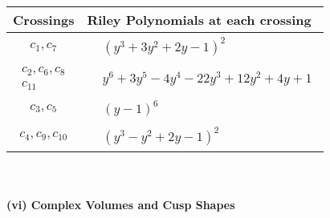 \documentclass[1p]{elsarticle_modified}
\theoremstyle{definition}
\begin{document}
\begin{tabular}{m{50pt}|m{274pt}}
Crossings & \hspace{64pt}Riley Polynomials at each crossing \\
\hline $$\begin{aligned}c_{1},c_{7}\end{aligned}$$&$\begin{aligned}
&(y^3+3 y^2+2 y-1)^2
\end{aligned}$\\
\hline $$\begin{aligned}c_{2},c_{6},c_{8}\\c_{11}\end{aligned}$$&$\begin{aligned}
&y^6+3 y^5-4 y^4-22 y^3+12 y^2+4 y+1
\end{aligned}$\\
\hline $$\begin{aligned}c_{3},c_{5}\end{aligned}$$&$\begin{aligned}
&(y-1)^6
\end{aligned}$\\
\hline $$\begin{aligned}c_{4},c_{9},c_{10}\end{aligned}$$&$\begin{aligned}
&(y^3- y^2+2 y-1)^2
\end{aligned}$\\
\hline
\end{tabular}\\~\\
\newpage\flushleft \textbf{(vi) Complex Volumes and Cusp Shapes}
\end{document}
